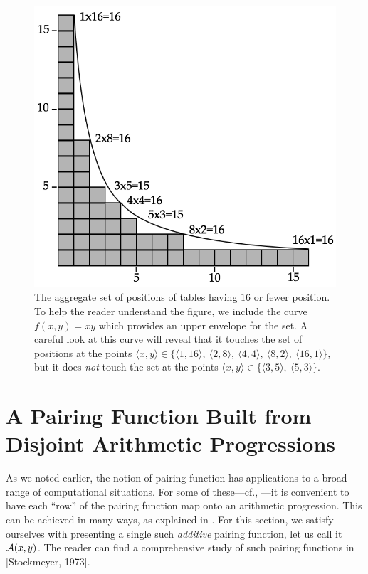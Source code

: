 \begin{figure}[htb]
\begin{center}
       \includegraphics[scale=0.4]{FiguresArithmetic/PairingHyp}
\caption{The aggregate set of positions of tables having $16$ or fewer position.  To help the reader understand the figure, we include the curve $f(x,y) = xy$ which provides an upper envelope for the set.  A careful look at this curve will reveal that it touches the set of positions at the points $\langle x,y \rangle \in \{ \langle 1,16 \rangle, \ \langle 2,8 \rangle, \ \langle 4,4 \rangle, \ \langle 8,2 \rangle, \ \langle 16,1 \rangle \}$, but it does {\em not} touch the set at the points $\langle x,y \rangle \in \{ \langle 3,5 \rangle, \ \langle 5,3 \rangle \}$. 
\label{f.hyp}}
\end{center}
\end{figure}

\section{A Pairing Function Built from Disjoint Arithmetic Progressions}

As we noted earlier, the notion of pairing function has applications to a broad range of computational situations.  For some of these---cf., \cite{Rosenberg03}---it is convenient to have each ``row'' of the pairing function map onto an arithmetic progression.  This can be achieved in many ways, as explained in \cite{Rosenberg03}.  For this section, we satisfy ourselves with presenting a single such {\em additive} pairing function, let us call it $\mbox{$\cal A$}(x,y)$.  The reader can find a comprehensive study of such pairing functions in [Stockmeyer, 1973].

